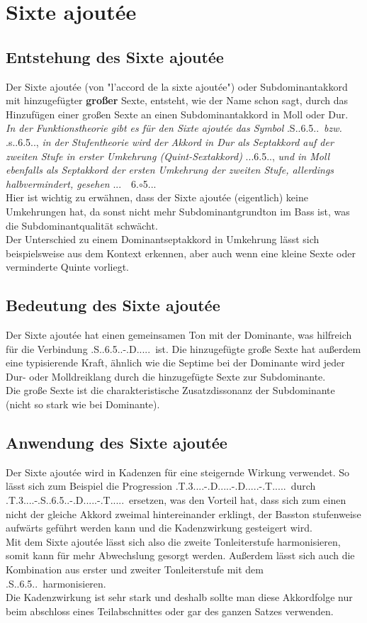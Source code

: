 \documentclass[a4paper]{article}
\newcommand{\mShoch}[4]{\HH.\romannumeral #1..#2.#3.#4.} %
\newcommand{\T}{\HH.T.....}
\newcommand{\TS}{\HH.T.3....}
\newcommand{\SA}{\HH.S..6.5..} %
\newcommand{\D}{\HH.D.....}
\newcommand{\SAm}{\HH.s..6.5..} %
\begin{document}
	\section{Sixte ajoutée}
	
	\subsection{Entstehung des Sixte ajoutée}
	Der Sixte ajoutée (von "l'accord de la sixte ajoutée") oder Subdominantakkord mit hinzugefügter \textbf{großer} Sexte, entsteht, wie der Name schon sagt, durch das Hinzufügen einer großen Sexte an einen Subdominantakkord in Moll oder Dur.\\
	\textit{In der Funktionstheorie gibt es für den Sixte ajoutée das Symbol} \SA\ \textit{bzw.} \SAm, \textit{in der Stufentheorie wird der Akkord in Dur als Septakkord auf der zweiten Stufe in erster Umkehrung (Quint-Sextakkord)} \mShoch{2}{6}{5}{}, \textit{und in Moll ebenfalls als Septakkord der ersten Umkehrung der zweiten Stufe, allerdings halbvermindert, gesehen} \mShoch{2}{\ \ 6}{$\circ$5}{}.\\
	Hier ist wichtig zu erwähnen, dass der Sixte ajoutée (eigentlich) keine Umkehrungen hat, da sonst nicht mehr Subdominantgrundton im Bass ist, was die Subdominantqualität schwächt.\\
	Der Unterschied zu einem Dominantseptakkord in Umkehrung lässt sich beispielsweise aus dem Kontext erkennen, aber auch wenn eine kleine Sexte oder verminderte Quinte vorliegt.
	
	\subsection{Bedeutung des Sixte ajoutée}
	Der Sixte ajoutée hat einen gemeinsamen Ton mit der Dominante, was hilfreich für die Verbindung \SA-\D\ ist. Die hinzugefügte große Sexte hat außerdem eine typisierende Kraft, ähnlich wie die Septime bei der Dominante wird jeder Dur- oder Molldreiklang durch die hinzugefügte Sexte zur Subdominante.\\
	Die große Sexte ist die charakteristische Zusatzdissonanz der Subdominante (nicht so stark wie bei Dominante).
	
	\subsection{Anwendung des Sixte ajoutée}
	Der Sixte ajoutée wird in Kadenzen für eine steigernde Wirkung verwendet. So lässt sich zum Beispiel die Progression \TS-\D-\D-\T\ durch \TS-\SA-\D-\T\ ersetzen, was den Vorteil hat, dass sich zum einen nicht der gleiche Akkord zweimal hintereinander erklingt, der Basston stufenweise aufwärts geführt werden kann und die Kadenzwirkung gesteigert wird.\\
	Mit dem Sixte ajoutée lässt sich also die zweite Tonleiterstufe harmonisieren, somit kann für mehr Abwechslung gesorgt werden. Außerdem lässt sich auch die Kombination aus erster und zweiter Tonleiterstufe mit dem \SA\ harmonisieren.\\ 
	Die Kadenzwirkung ist sehr stark und deshalb sollte man diese Akkordfolge nur beim abschloss eines Teilabschnittes oder gar des ganzen Satzes verwenden.
	
\end{document}

